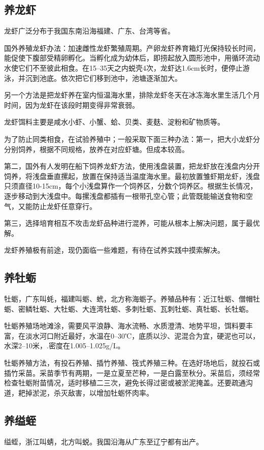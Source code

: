 \documentclass{ctexbook}
\begin{document}
\subsection{养龙虾}
龙虾广泛分布于我国东南沿海福建、广东、台湾等省。

国外养殖龙虾办法：加速雌性龙虾繁殖周期。产卵龙虾养育箱灯光保持较长时间，能促使下腹部受精卵孵化。当孵化成为幼体后，即捞起放入圆形池中，用循环流动水使它们不至彼此相食。在15--35天之内蜕壳4次，龙虾达1.6cm长时，便停止游泳，并沉到池底。依次把它们移到池中，池塘逐渐加大。

另一个方法是把龙虾养在室内恒温海水里，排除龙虾冬天在冰冻海水里生活几个月时间，因为龙虾在该段时期变得非常衰弱。

龙虾饵料主要是咸水小虾、小蟹、蛤、贝类、麦麸、淀粉和矿物质等。

为了防止同类相食，在试验养殖中；一般采取下面三种办法：第一，把大小龙虾分分别饲养，根据不同规格，放养在对应虾塘。但成本较高。

第二，国外有人发明在船下饲养龙虾方法，使用浅盘装置，把龙虾放在浅盘内分开饲养，将浅盘垂直摞起，放置在保持适当温度海水里。最初放置雏虾期龙虾，浅盘只须直径10-15cm，每个小浅盘算作一个饲养区，分数个饲养区。根据生长情况，逐步移动到大浅盘中。每摞浅盘都插有一根带孔空心管；此管既能输送食物和空气，又能防止龙虾任意穿行。

第三，选择培育相互不攻击龙虾品种进行混养，可能从根本上解决问题，属于最优解。

龙虾养殖极有前途，现仍面临一些难题，有待在试养实践中摸索解决。
\subsection{养牡蛎}
牡蛎，广东叫蚝，福建叫蛎、蚮，北方称海蛎子。养殖品种有：近江牡蛎、僧帽牡蛎、密鳞牡蛎、大牡蛎、大连湾牡蛎、多刺牡蛎、瓦刺牡蛎、真牡蛎、长牡蛎。

牡蛎养殖场地滩涂，需要风平浪静、海水流畅、水质澄清、地势平坦，饵料要丰富，在淡水河口附近最好，水温在0--30℃，底质以沙、泥混合为宜，硬泥也可以，水深2--10米，.密度在1.005--1.025g/L。

牡蛎养殖方法，有投石养殖、插竹养殖、筏式养殖三种。在选好场地后，就投石或插竹采苗。采苗季节有两期，一是立夏至芒种，一是白露至秋分。采苗后，须经常检查牡蛎附苗情况，适时移植二三次，避免长得过密或被淤泥掩盖。还要疏通沟道，耙掉淤泥，杀灭敌害，以增加牡蛎怀肉率。
\subsection{养缢蛭}
缢蛭，浙江叫蜻，北方叫蜕。我国沿海从广东至辽宁都有出产。
\end{document}
